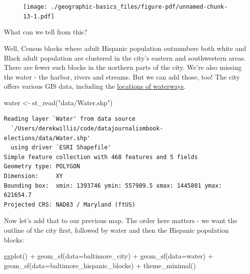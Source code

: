 \documentclass[
  letterpaper,
  DIV=11,
  numbers=noendperiod]{scrreprt}
\newenvironment{Shaded}{\begin{snugshade}}{\end{snugshade}}
\newcommand{\AttributeTok}[1]{\textcolor[rgb]{0.40,0.45,0.13}{#1}}
\newcommand{\FunctionTok}[1]{\textcolor[rgb]{0.28,0.35,0.67}{#1}}
\newcommand{\NormalTok}[1]{\textcolor[rgb]{0.00,0.23,0.31}{#1}}
\newcommand{\OtherTok}[1]{\textcolor[rgb]{0.00,0.23,0.31}{#1}}
\newcommand{\SpecialCharTok}[1]{\textcolor[rgb]{0.37,0.37,0.37}{#1}}
\newcommand{\StringTok}[1]{\textcolor[rgb]{0.13,0.47,0.30}{#1}}
\begin{document}
\begin{figure}[H]

{\centering \texttt{[image: ./geographic-basics\_files/figure-pdf/unnamed-chunk-13-1.pdf]}

}

\end{figure}

What can we tell from this?

Well, Census blocks where adult Hispanic population outnumbers both
white and Black adult population are clustered in the city's eastern and
southwestern areas. There are fewer such blocks in the northern parts of
the city. We're also missing the water - the harbor, rivers and streams.
But we can add those, too! The city offers various GIS data, including
the
\href{https://data.baltimorecity.gov/datasets/water/explore?location=89.796632\%2C-66.364958\%2C0.00}{locations
of waterways}.

\begin{Shaded}
\begin{Highlighting}[]
\NormalTok{water }\OtherTok{\textless{}{-}} \FunctionTok{st\_read}\NormalTok{(}\StringTok{"data/Water.shp"}\NormalTok{)}
\end{Highlighting}
\end{Shaded}

\begin{verbatim}
Reading layer `Water' from data source 
  `/Users/derekwillis/code/datajournalismbook-elections/data/Water.shp' 
  using driver `ESRI Shapefile'
Simple feature collection with 468 features and 5 fields
Geometry type: POLYGON
Dimension:     XY
Bounding box:  xmin: 1393746 ymin: 557989.5 xmax: 1445801 ymax: 621654.7
Projected CRS: NAD83 / Maryland (ftUS)
\end{verbatim}

Now let's add that to our previous map. The order here matters - we want
the outline of the city first, followed by water and then the Hispanic
population blocks:

\begin{Shaded}
\begin{Highlighting}[]
\FunctionTok{ggplot}\NormalTok{() }\SpecialCharTok{+}
  \FunctionTok{geom\_sf}\NormalTok{(}\AttributeTok{data=}\NormalTok{baltimore\_city) }\SpecialCharTok{+}
  \FunctionTok{geom\_sf}\NormalTok{(}\AttributeTok{data=}\NormalTok{water) }\SpecialCharTok{+}
  \FunctionTok{geom\_sf}\NormalTok{(}\AttributeTok{data=}\NormalTok{baltimore\_hispanic\_blocks) }\SpecialCharTok{+}
  \FunctionTok{theme\_minimal}\NormalTok{()}
\end{Highlighting}
\end{Shaded}
\end{document}
